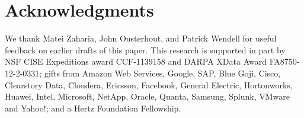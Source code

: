 \section{Acknowledgments}
We thank Matei Zaharia, John Ousterhout, and Patrick Wendell for useful feedback on earlier drafts of this paper.
This research is supported in part by NSF CISE Expeditions award CCF-1139158 and DARPA XData Award FA8750-12-2-0331; gifts from Amazon Web Services, Google, SAP,  Blue Goji, Cisco, Clearstory Data, Cloudera, Ericsson, Facebook, General Electric, Hortonworks, Huawei, Intel, Microsoft, NetApp, Oracle, Quanta, Samsung, Splunk, VMware and Yahoo!; and
a Hertz Foundation Fellowship.
